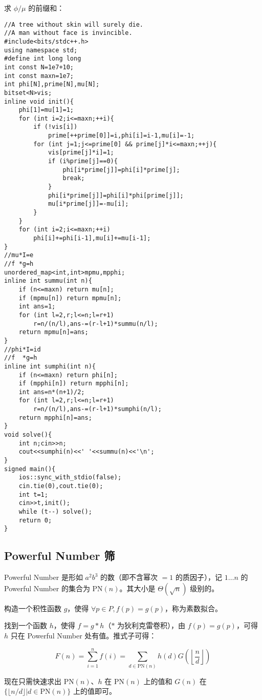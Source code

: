 求 $\phi/\mu$ 的前缀和：

\begin{verbatim}
//A tree without skin will surely die.
//A man without face is invincible.
#include<bits/stdc++.h>
using namespace std;
#define int long long
int const N=1e7+10;
int const maxn=1e7;
int phi[N],prime[N],mu[N];
bitset<N>vis;
inline void init(){
    phi[1]=mu[1]=1;
    for (int i=2;i<=maxn;++i){
        if (!vis[i])
            prime[++prime[0]]=i,phi[i]=i-1,mu[i]=-1;
        for (int j=1;j<=prime[0] && prime[j]*i<=maxn;++j){
            vis[prime[j]*i]=1;
            if (i%prime[j]==0){
                phi[i*prime[j]]=phi[i]*prime[j];
                break;
            }
            phi[i*prime[j]]=phi[i]*phi[prime[j]];
            mu[i*prime[j]]=-mu[i];
        }
    }
    for (int i=2;i<=maxn;++i)
        phi[i]+=phi[i-1],mu[i]+=mu[i-1];
}
//mu*I=e
//f *g=h
unordered_map<int,int>mpmu,mpphi;
inline int summu(int n){
    if (n<=maxn) return mu[n];
    if (mpmu[n]) return mpmu[n];
    int ans=1;
    for (int l=2,r;l<=n;l=r+1)
        r=n/(n/l),ans-=(r-l+1)*summu(n/l);
    return mpmu[n]=ans;
}
//phi*I=id
//f  *g=h
inline int sumphi(int n){
    if (n<=maxn) return phi[n];
    if (mpphi[n]) return mpphi[n];
    int ans=n*(n+1)/2;
    for (int l=2,r;l<=n;l=r+1)
        r=n/(n/l),ans-=(r-l+1)*sumphi(n/l);
    return mpphi[n]=ans;
}
void solve(){
    int n;cin>>n;
    cout<<sumphi(n)<<' '<<summu(n)<<'\n';
}
signed main(){
    ios::sync_with_stdio(false);
    cin.tie(0),cout.tie(0);
    int t=1;
    cin>>t,init();
    while (t--) solve();
    return 0;
}
\end{verbatim}

\subsection{Powerful Number 筛}

Powerful Number 是形如 $a^2b^3$ 的数（即不含幂次 $=1$ 的质因子），记 $1\dots n$ 的 Powerful Number 的集合为 $\mathrm{PN}(n)$。其大小是 $\Theta(\sqrt{n})$ 级别的。

构造一个积性函数 $g$，使得 $\forall p \in P, f(p) = g(p)$，称为素数拟合。

找到一个函数 $h$，使得 $f = g * h$（$*$ 为狄利克雷卷积），由 $f(p)=g(p)$，可得 $h$ 只在 Powerful Number 处有值。推式子可得：

$$
F(n) = \sum\limits_{i=1}^n f(i) = \sum_{d\in\mathrm{PN}(n)}h(d)G(\left\lfloor\frac{n}{d}\right\rfloor)
$$

现在只需快速求出 $\mathrm{PN}(n)$、$h$ 在 $\mathrm{PN}(n)$ 上的值和 $G(n)$ 在 $\{\lfloor n/d\rfloor | d \in \mathrm{PN}(n)\}$ 上的值即可。

